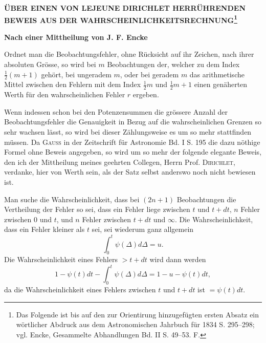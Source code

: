 \documentclass[11pt]{article}
\newcommand{\scn}[1]{\textsc{#1}}
\begin{document}
\begin{center}
{\Large\bfseries ÜBER EINEN VON LEJEUNE DIRICHLET HERRÜHRENDEN BEWEIS AUS DER WAHRSCHEINLICHKEITSRECHNUNG\footnote{Das Folgende ist bis auf den zur Orientirung hinzugefügten ersten Absatz ein wörtlicher Abdruck aus dem Astronomischen Jahrbuch für 1834 S. 295--298; vgl. Encke, Gesammelte Abhandlungen Bd. II S. 49--53. F.}\par}
\vspace{0.3em}
{\large\bfseries Nach einer Mittheilung von J. F. Encke\par}
\vspace{0.8em}
\end{center}

Ordnet man die Beobachtungsfehler, ohne Rücksicht auf ihr Zeichen, nach ihrer absoluten Grösse, so wird bei $m$ Beobachtungen der, welcher zu dem Index $\frac12(m+1)$ gehört, bei ungeradem $m$, oder bei geradem $m$ das arithmetische Mittel zwischen den Fehlern mit dem Index $\frac12m$ und $\frac12m+1$ einen genäherten Werth für den wahrscheinlichen Fehler $r$ ergeben.

Wenn indessen schon bei den Potenzensummen die grössere Anzahl der Beobachtungsfehler die Genauigkeit in Bezug auf die wahrscheinlichen Grenzen so sehr wachsen lässt, so wird bei dieser Zählungsweise es um so mehr stattfinden müssen. Da \scn{Gauss} in der Zeitschrift für Astronomie Bd. I S. 195 die dazu nöthige Formel ohne Beweis angegeben, so wird um so mehr der folgende elegante Beweis, den ich der Mittheilung meines geehrten Collegen, Herrn Prof. \scn{Dirichlet}, verdanke, hier von Werth sein, als der Satz selbst anderswo noch nicht bewiesen ist.

Man suche die Wahrscheinlichkeit, dass bei $(2n+1)$ Beobachtungen die Vertheilung der Fehler so sei, dass ein Fehler liege zwischen $t$ und $t+dt$, $n$ Fehler zwischen $0$ und $t$, und $n$ Fehler zwischen $t+dt$ und $\infty$. Die Wahrscheinlichkeit, dass ein Fehler kleiner als $t$ sei, sei wiederum ganz allgemein
\[
 \int_0^t\psi(\Delta)d\Delta=u.
\]
Die Wahrscheinlichkeit eines Fehlers $>t+dt$ wird dann werden
\[
 1-\psi(t)dt-\int_0^t\psi(\Delta)d\Delta=1-u-\psi(t)dt,
\]
da die Wahrscheinlichkeit eines Fehlers zwischen $t$ und $t+dt$ ist $=\psi(t)dt$.
\end{document}
